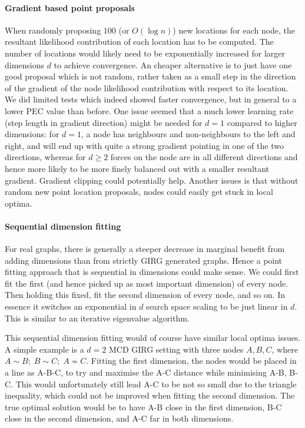 \paragraph{Gradient based point proposals}
When randomly proposing $100$ (or $O(\log n)$) new locations for each node, the resultant likelihood contribution of each location has to be computed. The number of locations would likely need to be exponentially increased for larger dimensions $d$ to achieve convergence.
An cheaper alternative is to just have one good proposal which is not random, rather taken as a small step in the direction of the gradient of the node likelihood contribution with respect to its location.
We did limited tests which indeed showed faster convergence, but in general to a lower PEC value than before. One issue seemed that a much lower learning rate (step length in gradient direction) might be needed for $d=1$ compared to higher dimensions: for $d=1$, a node has neighbours and non-neighbours to the left and right, and will end up with quite a strong gradient pointing in one of the two directions, whereas for $d \geq 2$ forces on the node are in all different directions and hence more likely to be more finely balanced out with a smaller resultant gradient. Gradient clipping could potentially help.
Another issues is that without random new point location proposals, nodes could easily get stuck in local optima.

\paragraph{Sequential dimension fitting}
For real graphs, there is generally a steeper decrease in marginal benefit from adding dimensions than from strictly GIRG generated graphs. Hence a point fitting approach that is sequential in dimensions could make sense. We could first fit the first (and hence picked up as most important dimension) of every node. Then holding this fixed, fit the second dimension of every node, and so on. In essence it switches an exponential in $d$ search space scaling to be just linear in $d$. This is similar to an iterative eigenvalue algorithm.

This sequential dimension fitting would of course have similar local optima issues. A simple example is a $d=2$ MCD GIRG setting with three nodes $A,B,C$, where $A \sim B;\; B \sim C;\; A \nsim C$. Fitting the first dimension, the nodes would be placed in a line as A-B-C, to try and maximise the A-C distance while minimising A-B, B-C. This would unfortunately still lead A-C to be not so small due to the triangle inequality, which could not be improved when fitting the second dimension. The true optimal solution would be to have A-B close in the first dimension, B-C close in the second dimension, and A-C far in both dimensions.


